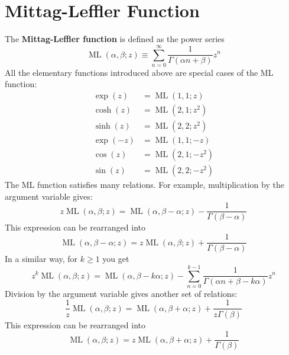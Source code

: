 \section{Mittag-Leffler Function}
The \textbf{Mittag-Leffler function} is defined as the power series
\begin{equation}
    \operatorname{ML}(\alpha, \beta; z) \equiv \sum_{n = 0}^{\infty} \frac{1}{\Gamma(\alpha n + \beta)} z^{n}
\end{equation}
All the elementary functions introduced above are special cases of the ML function:
\begin{align}
    \exp(z) &= \operatorname{ML}(1, 1; z) \\
    \cosh(z) &= \operatorname{ML}\left(2, 1; z^{2}\right) \\
    \sinh(z) &= \operatorname{ML}\left(2, 2; z^{2}\right) \\
    \exp(-z) &= \operatorname{ML}(1, 1; -z) \\
    \cos(z) &= \operatorname{ML}\left(2, 1; -z^{2}\right) \\
    \sin(z) &= \operatorname{ML}\left(2, 2; -z^{2}\right)
\end{align}
The ML function satisfies many relations. For example, multiplication by the argument variable gives:
\begin{equation}
    z \operatorname{ML}(\alpha, \beta; z) = \operatorname{ML}(\alpha, \beta - \alpha; z) - \frac{1}{\Gamma(\beta - \alpha)}
\end{equation}
This expression can be rearranged into
\begin{equation}
    \operatorname{ML}(\alpha, \beta - \alpha; z) = z \operatorname{ML}(\alpha, \beta; z) + \frac{1}{\Gamma(\beta - \alpha)}
\end{equation}
In a similar way, for $k \geq 1$ you get
\begin{equation}
    z^{k} \operatorname{ML}(\alpha, \beta; z) = \operatorname{ML}(\alpha, \beta - k\alpha; z) - \sum_{n = 0}^{k-1} \frac{1}{\Gamma(\alpha n + \beta - k \alpha)} z^{n}
\end{equation}
Division by the argument variable gives another set of relations:
\begin{equation}
    \frac{1}{z} \operatorname{ML}(\alpha, \beta; z) = \operatorname{ML}(\alpha, \beta + \alpha; z) + \frac{1}{z \Gamma(\beta)}
\end{equation}
This expression can be rearranged into
\begin{equation}
    \operatorname{ML}(\alpha, \beta; z) = z \operatorname{ML}(\alpha, \beta + \alpha; z) + \frac{1}{\Gamma(\beta)}
\end{equation}
